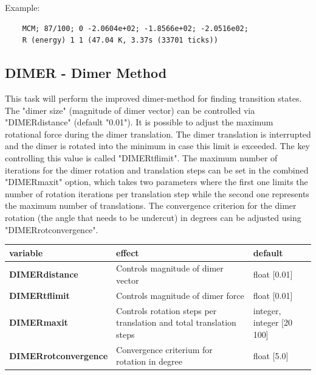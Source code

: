 \documentclass[10pt,a4paper]{article} %
\begin{document}
	Example:\\
	\begin{lstlisting}
	MCM; 87/100; 0 -2.0604e+02; -1.8566e+02; -2.0516e02;
	R (energy) 1 1 (47.04 K, 3.37s (33701 ticks))
	\end{lstlisting}

	\subsection{DIMER - Dimer Method}
	This task will perform the improved dimer-method for finding transition states\supercite{dimermethod}. The "dimer size" (magnitude of dimer vector) can be controlled via "DIMERdistance" (default "0.01").
	It is possible to adjust the maximum rotational force during the dimer translation. The dimer translation is interrupted and the dimer is rotated into the minimum in case this limit is exceeded. The key controlling this value is called "DIMERtflimit".
	The maximum number of iterations for the dimer rotation and translation steps can be set in the combined "DIMERmaxit" option, which takes two parameters where the first one limits the number of rotation iterations per translation step while the second one represents the maximum number of translations.
	The convergence criterion for the dimer rotation (the angle that needs to be undercut) in degrees can be adjusted using "DIMERrotconvergence".
		
	\begin{longtable}{|p{4cm}|p{3.5cm}|p{2.5cm}|}
		variable & effect & default \\
		\hline
		\textbf{DIMERdistance} & Controls magnitude of dimer vector & float [0.01] \\
		\textbf{DIMERtflimit} & Controls magnitude of dimer force & float [0.01] \\
		\textbf{DIMERmaxit}& Controls rotation steps per translation and total translation steps & integer, integer [20 100]\\
		\textbf{DIMERrotconvergence} & Convergence criterium for rotation in degree & float [5.0] \\
	\end{longtable}
	
\end{document}

